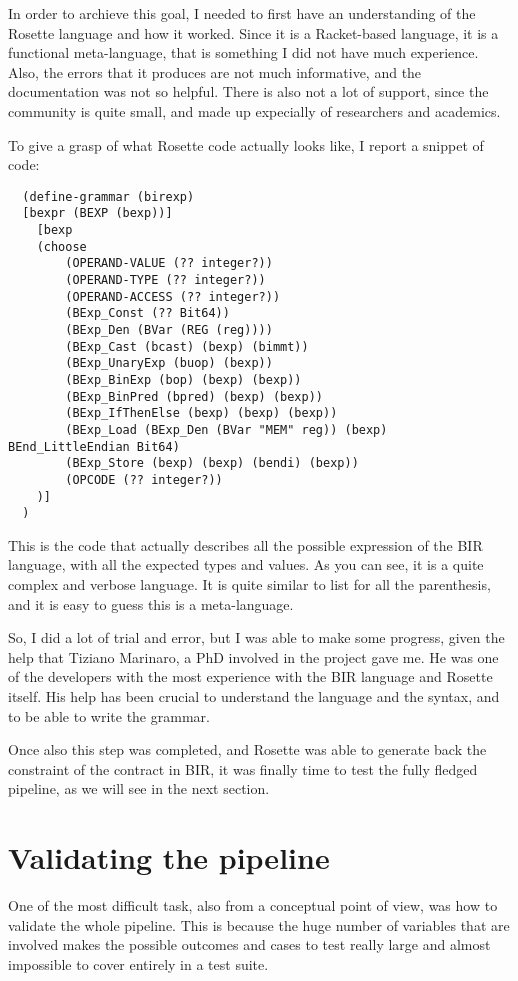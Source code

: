 In order to archieve this goal, I needed to first have an understanding of the
Rosette language and how it worked. Since it is a Racket-based language, it is a
functional meta-language, that is something I did not have much experience. Also,
the errors that it produces are not much informative, and the documentation was
not so helpful. There is also not a lot of support, since the community is quite
small, and made up expecially of researchers and academics.

To give a grasp of what Rosette code actually looks like, I report a snippet of
code:

\begin{verbatim}
  (define-grammar (birexp)
  [bexpr (BEXP (bexp))]
    [bexp
    (choose
        (OPERAND-VALUE (?? integer?))
        (OPERAND-TYPE (?? integer?))
        (OPERAND-ACCESS (?? integer?))
        (BExp_Const (?? Bit64))
        (BExp_Den (BVar (REG (reg))))
        (BExp_Cast (bcast) (bexp) (bimmt))
        (BExp_UnaryExp (buop) (bexp))
        (BExp_BinExp (bop) (bexp) (bexp))
        (BExp_BinPred (bpred) (bexp) (bexp))
        (BExp_IfThenElse (bexp) (bexp) (bexp))
        (BExp_Load (BExp_Den (BVar "MEM" reg)) (bexp) BEnd_LittleEndian Bit64)
        (BExp_Store (bexp) (bexp) (bendi) (bexp))
        (OPCODE (?? integer?))
    )]
  )
\end{verbatim}

This is the code that actually describes all the possible expression of the BIR language,
with all the expected types and values. As you can see, it is a quite complex
and verbose language. It is quite similar to list for all the parenthesis, and
it is easy to guess this is a meta-language.

So, I did a lot of trial and error, but I was able to make some progress, given the
help that Tiziano Marinaro, a PhD involved in the project gave me. He was one of
the developers with the most experience with the BIR language and Rosette itself.
His help has been crucial to understand the language and the syntax, and to be able
to write the grammar.

Once also this step was completed, and Rosette was able to generate back the
constraint of the contract in BIR, it was finally time to test the fully fledged
pipeline, as we will see in the next section.

\section{Validating the pipeline}
\label{cha:Validating the pipeline} One of the most difficult task, also from a conceptual
point of view, was how to validate the whole pipeline. This is because the huge number
of variables that are involved makes the possible outcomes and cases to test really
large and almost impossible to cover entirely in a test suite.

